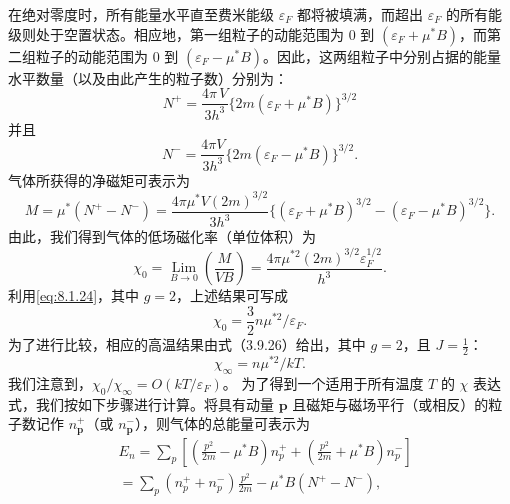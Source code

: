 在绝对零度时，所有能量水平直至费米能级 \(\varepsilon_F\) 都将被填满，而超出 \(\varepsilon_F\) 的所有能级则处于空置状态。相应地，第一组粒子的动能范围为 0 到 \((\varepsilon_F + \mu^*B)\)，而第二组粒子的动能范围为 0 到 \((\varepsilon_F - \mu^*B)\)。因此，这两组粒子中分别占据的能量水平数量（以及由此产生的粒子数）分别为：
\begin{equation}\tag{8.1.39}\label{eq:8.1.39}
N ^{+} = \frac { 4 \pi \, V } { 3 h ^{3} } \{ 2 m ( \varepsilon _ { F } + \mu ^{*} B ) \} ^{3 / 2}
\end{equation}
并且
\begin{equation}\tag{8.1.40}\label{eq:8.1.40}
N ^{-} = \frac { 4 \pi V } { 3 h ^{3} } \{ 2 m ( \varepsilon _ { F } - \mu ^{*} B ) \} ^{3 / 2} .
\end{equation}
气体所获得的净磁矩可表示为
\begin{equation}\tag{8.1.41}\label{eq:8.1.41}
M = \mu ^{*} ( N ^{+} - N ^{-} ) = \frac { 4 \pi \mu ^{*} V ( 2 m ) ^{3 / 2} } { 3 h ^{3} } \{ ( \varepsilon _ { F } + \mu ^{*} B ) ^{3 / 2} - ( \varepsilon _ { F } - \mu ^{*} B ) ^{3 / 2} \} .
\end{equation}
由此，我们得到气体的低场磁化率（单位体积）为
\begin{equation}\tag{8.1.42}\label{eq:8.1.42}
\chi _ { 0 } = \operatorname* { L i m } _ { B \to 0 } \left( \frac { M } { V B } \right) = \frac { 4 \pi \mu ^{* 2} ( 2 m ) ^{3 / 2} \varepsilon _ { F } ^{1 / 2} } { h ^{3} } .
\end{equation}
利用\autoref{eq:8.1.24}，其中 \(g=2\)，上述结果可写成
\begin{equation}\tag{8.1.43}\label{eq:8.1.43}
\chi _ { 0 } = \frac { 3 } { 2 } n \mu ^{* 2} / \varepsilon _ { F } .
\end{equation}
为了进行比较，相应的高温结果由式（3.9.26）给出，其中 \(g=2\)，且 \(J=\frac{1}{2}\)：
\begin{equation}\tag{8.1.44}\label{eq:8.1.44}
\chi _ { \infty } = n \mu ^{* 2} / k T .
\end{equation}
我们注意到，\(\chi_0/\chi_\infty = O(kT/\varepsilon_F)\)。
为了得到一个适用于所有温度 \(T\) 的 \(\chi\) 表达式，我们按如下步骤进行计算。将具有动量 \(\boldsymbol{p}\) 且磁矩与磁场平行（或相反）的粒子数记作 \(n_{\boldsymbol{p}}^{+}\)（或 \(n_{\boldsymbol{p}}^{-}\)），则气体的总能量可表示为
\begin{equation}\tag{8.1.45}\label{eq:8.1.45}
\begin{array}{rl} & { E _ { n } = \sum _ { p } \left[ \left( \frac { p ^{2} } { 2 m } - \mu ^{*} B \right) n _ { p } ^{+} + \left( \frac { p ^{2} } { 2 m } + \mu ^{*} B \right) n _ { p } ^{-} \right] } \\& { = \sum _ { p } ( n _ { p } ^{+} + n _ { p } ^{-} ) \frac { p ^{2} } { 2 m } - \mu ^{*} B ( N ^{+} - N ^{-} ) , } \end{array}
\end{equation}
